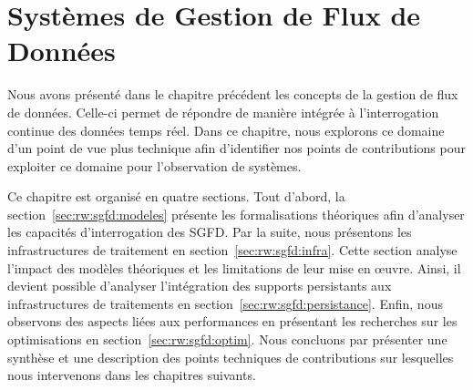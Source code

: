
\chapter{Systèmes de Gestion de Flux de Données}\label{chap:rw:sgfd}
\chaptertoc
Nous avons présenté dans le chapitre précédent les concepts de la gestion de flux de données. Celle-ci permet de répondre de manière intégrée à l'interrogation continue des données temps réel. Dans ce chapitre, nous explorons ce domaine d'un point de vue plus technique afin d'identifier nos points de contributions pour exploiter ce domaine pour l'observation de systèmes.

Ce chapitre est organisé en quatre sections. Tout d'abord, la section~\ref{sec:rw:sgfd:modeles} présente les formalisations théoriques afin d'analyser les capacités d'interrogation des SGFD. Par la suite, nous présentons les infrastructures de traitement en section~\ref{sec:rw:sgfd:infra}. Cette section analyse l'impact des modèles théoriques et les limitations de leur mise en œuvre. Ainsi, il devient possible d'analyser l'intégration des supports persistants aux infrastructures de traitements en section~\ref{sec:rw:sgfd:persistance}. Enfin, nous observons des aspects liées aux performances en présentant les recherches sur les optimisations en section~\ref{sec:rw:sgfd:optim}. Nous concluons par présenter une synthèse et une description des points techniques de contributions sur lesquelles nous intervenons dans les chapitres suivants.






